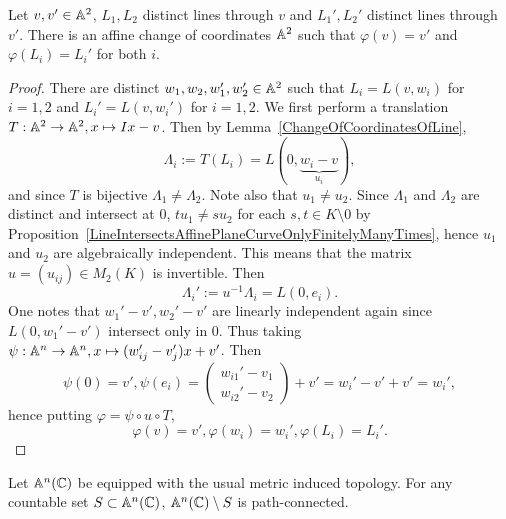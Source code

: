 \begin{proposition}
    Let $v,v'\in\mathbb{A}^2$, $L_1,L_2$ distinct lines through $v$ and $L_1',L_2'$ distinct lines through $v'$. There is an affine change of coordinates $\mathbb{A}^2$ such that $\varphi(v)=v'$ and $\varphi(L_i)=L_i'$ for both $i$.
\end{proposition}
\begin{proof}
    There are distinct $w_1,w_2,w_1',w_2'\in\mathbb{A}^2$ such that $L_i=L(v,w_i)$ for $i=1,2$ and $L_i'=L(v,w_i')$ for $i=1,2$. We first perform a translation $T: \mathbb{A}^2\rightarrow \mathbb{A}^2, x \mapsto Ix-v$. Then by Lemma~\ref{ChangeOfCoordinatesOfLine}, $$\Lambda_i:=T(L_i)=L(0,\underbrace{w_i-v}_{u_i}),$$
    and since $T$ is bijective $\Lambda_1\neq \Lambda_2$. Note also that $u_1\neq u_2$. Since $\Lambda_1$ and $\Lambda_2$ are distinct and intersect at $0$, $tu_1\neq su_2$ for each $s,t\in K\setminus 0$ by Proposition~\ref{LineIntersectsAffinePlaneCurveOnlyFinitelyManyTimes}, hence $u_1$ and $u_2$ are algebraically independent. This means that the matrix $u = (u_{ij})\in M_2(K)$ is invertible. Then 
    $$\Lambda_i':= u^{-1}\Lambda_i = L(0,e_i).$$
    One notes that $w_1'-v', w_2'-v'$ are linearly independent again since $L(0,w_1'-v')$ intersect only in $0$. Thus taking $\psi: \mathbb{A}^n\rightarrow \mathbb{A}^n, x\mapsto (w_{ij}'-v_{j}')x + v'$. Then 
    $$\psi(0)=v', \psi(e_i)=\begin{pmatrix}
        w_{i1}'-v_1 \\ w_{i2}'-v_2
    \end{pmatrix}+v' = w_i'-v'+v' = w_i',$$
    hence putting $\varphi = \psi \circ u\circ T$, 
    $$\varphi(v)=v',\varphi(w_i)=w_i', \varphi(L_i)=L_i'.$$
\end{proof}
\begin{lemma}\label{AffineComplexSpaceWithFiniteNumberOfPointsRemovedIsPathConnected}
    Let $\mathbb{A}^n(\mathbb{C})$ be equipped with the usual metric induced topology. For any countable set $S\subset \mathbb{A}^n(\mathbb{C})$, $\mathbb{A}^n(\mathbb{C})\setminus S$ is path-connected. 
\end{lemma}
